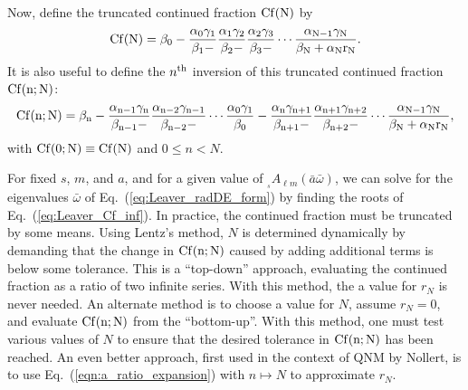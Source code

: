 \documentclass[11pt]{article}
\newcommand{\scA}[4][]{{}_{{}_{#2}}A^{#1}_{#3}(#4)}
\begin{document}
Now, define the truncated continued fraction $\rm{Cf}(N)$ by
\begin{equation}\label{eq:Leaver_Cf_N}
  \rm{Cf}(N) = \beta_0 -\frac{\alpha_0\gamma_1}{\beta_1-}
             \frac{\alpha_1\gamma_2}{\beta_2-}
             \frac{\alpha_2\gamma_3}{\beta_3-}\cdots
             \frac{\alpha_{N-1}\gamma_N}{\beta_N+\alpha_N r_N}.
\end{equation}
It is also useful to define the $n^{\rm th}$ inversion of this
truncated continued fraction $\rm{Cf}(n;N)$:
\begin{equation}\label{eq:Leaver_Cf_N_inv}
  \rm{Cf}(n;N) = \beta_n-\frac{\alpha_{n-1}\gamma_n}{\beta_{n-1}-}
                         \frac{\alpha_{n-2}\gamma_{n-1}}{\beta_{n-2}-}
                         \cdots\frac{\alpha_0\gamma_1}{\beta_0}
                         -\frac{\alpha_n\gamma_{n+1}}{\beta_{n+1}-}
                          \frac{\alpha_{n+1}\gamma_{n+2}}{\beta_{n+2}-}
                          \cdots\frac{\alpha_{N-1}\gamma_N}{\beta_N+\alpha_N r_N},
\end{equation}
with $\rm{Cf}(0;N)\equiv\rm{Cf}(N)$ and $0\le n<N$.

For fixed $s$, $m$, and $a$, and for a given value of
$\scA{s}{\ell{m}}{\bar{a}\bar\omega}$, we can solve for the
eigenvalues $\bar\omega$ of Eq.~(\ref{eq:Leaver_radDE_form}) by
finding the roots of Eq.~(\ref{eq:Leaver_Cf_inf}).  In practice, the
continued fraction must be truncated by some means.  Using Lentz's
method, $N$ is determined dynamically by demanding that the change in
$\rm{Cf}(n;N)$ caused by adding additional terms is below some
tolerance.  This is a ``top-down'' approach, evaluating the continued
fraction as a ratio of two infinite series.  With this method, the a
value for $r_N$ is never needed.  An alternate method is to choose a
value for $N$, assume $r_N=0$, and evaluate $\rm{Cf}(n;N)$ from the
``bottom-up''.  With this method, one must test various values of $N$
to ensure that the desired tolerance in $\rm{Cf}(n;N)$ has been
reached.  An even better approach, first used in the context of QNM by
Nollert, is to use Eq.~(\ref{eqn:a_ratio_expansion}) with $n\mapsto N$ to
approximate $r_N$.


\vspace*{0.5in}
\end{document}
